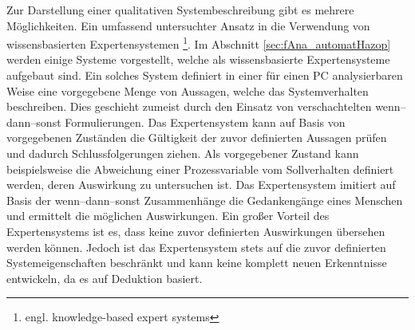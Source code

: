 Zur Darstellung einer qualitativen Systembeschreibung gibt es mehrere M\"oglichkeiten. Ein umfassend untersuchter Ansatz in die Verwendung von wissensbasierten Expertensystemen \footnote{engl. knowledge-based expert systems}. Im Abschnitt \ref{sec:fAna_automatHazop} werden einige Systeme vorgestellt, welche als wissensbasierte Expertensysteme aufgebaut sind. Ein solches System definiert in einer f\"ur einen PC analysierbaren Weise eine vorgegebene Menge von Aussagen, welche das Systemverhalten beschreiben. Dies geschieht zumeist durch den Einsatz von verschachtelten wenn--dann--sonst Formulierungen. Das Expertensystem kann auf Basis von vorgegebenen Zust\"anden die G\"ultigkeit der zuvor definierten Aussagen pr\"ufen und dadurch Schlussfolgerungen ziehen. Als vorgegebener Zustand kann beispielsweise die Abweichung einer Prozessvariable vom Sollverhalten definiert werden, deren Auswirkung zu untersuchen ist. Das Expertensystem imitiert auf Basis der wenn--dann--sonst Zusammenh\"ange die Gedankeng\"ange eines Menschen und ermittelt die m\"oglichen Auswirkungen. Ein gro\ss{}er Vorteil des Expertensystems ist es, dass keine zuvor definierten Auswirkungen \"ubersehen werden k\"onnen. Jedoch ist das Expertensystem stets auf die zuvor definierten Systemeigenschaften beschr\"ankt und kann keine komplett neuen Erkenntnisse entwickeln, da es auf Deduktion basiert.

